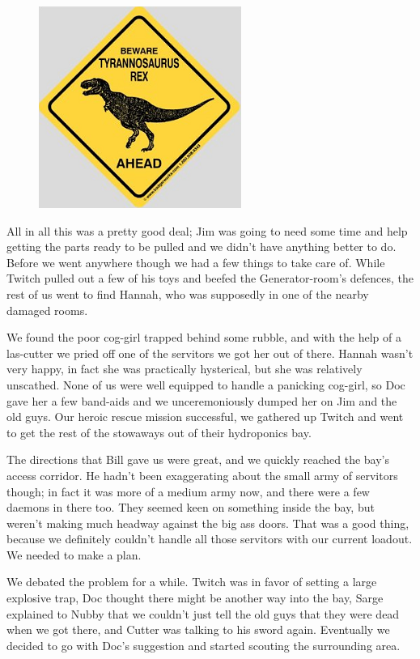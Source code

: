 \begin{figure}
	\begin{center}
		\includegraphics[width=\figwidth]{pics/7/29.png}
	\end{center}
\end{figure}
All in all this was a pretty good deal; 
Jim was going to need some time and help getting the parts ready to be pulled and we didn’t have anything better to do. 
Before we went anywhere though we had a few things to take care of. 
While Twitch pulled out a few of his toys and beefed the Generator-room’s defences, the rest of us went to find Hannah, who was supposedly in one of the nearby damaged rooms.

We found the poor cog-girl trapped behind some rubble, and with the help of a las-cutter we pried off one of the servitors we got her out of there. 
Hannah wasn’t very happy, in fact she was practically hysterical, but she was relatively unscathed. 
None of us were well equipped to handle a panicking cog-girl, so Doc gave her a few band-aids and we unceremoniously dumped her on Jim and the old guys. 
Our heroic rescue mission successful, we gathered up Twitch and went to get the rest of the stowaways out of their hydroponics bay.

The directions that Bill gave us were great, and we quickly reached the bay’s access corridor. 
He hadn’t been exaggerating about the small army of servitors though; 
in fact it was more of a medium army now, and there were a few daemons in there too. 
They seemed keen on something inside the bay, but weren’t making much headway against the big ass doors. 
That was a good thing, because we definitely couldn’t handle all those servitors with our current loadout. 
We needed to make a plan.

We debated the problem for a while. 
Twitch was in favor of setting a large explosive trap, Doc thought there might be another way into the bay, Sarge explained to Nubby that we couldn’t just tell the old guys that they were dead when we got there, and Cutter was talking to his sword again. 
Eventually we decided to go with Doc’s suggestion and started scouting the surrounding area.

